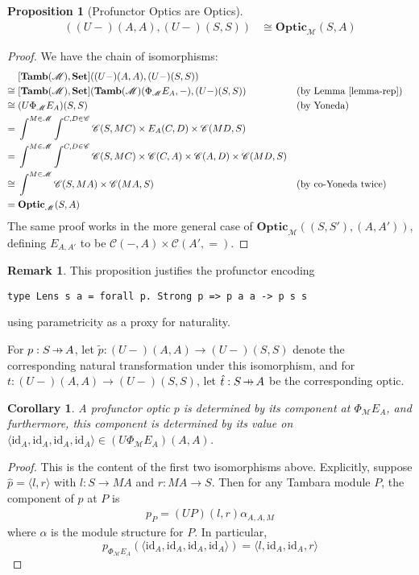 \documentclass[11pt,a4paper]{article}
\theoremstyle{plain}
\newtheorem{proposition}[theorem]{Proposition}
\newtheorem{corollary}[theorem]{Corollary}
\theoremstyle{definition}
\newtheorem{remark}[theorem]{Remark}
\newcommand{\C}{\mathscr{C}}
\newcommand{\M}{\mathscr{M}}
\newcommand{\Pastro}{\Phi}
\newcommand{\Set}{\mathbf{Set}}
\newcommand{\Optic}{\mathbf{Optic}}
\newcommand{\Tamb}{\mathbf{Tamb}}
\newcommand{\id}{\mathrm{id}}
\newcommand{\hto}{\ensuremath{\,\mathaccent\shortmid\rightarrow\,}}
\begin{document}
\begin{proposition}[Profunctor Optics are Optics]\label{prop-profunctor-optics-are-optics}
  \begin{align*}
    [\Tamb(\M), \Set]((U-)(A,A),(U-)(S,S)) &\cong \Optic_\M(S, A)
  \end{align*}
\end{proposition}
\begin{proof}
  We have the chain of isomorphisms:
  \begin{align*}
    &[\Tamb(\M), \Set]((U-)(A,A),(U-)(S,S)) \\
    \cong \;&[\Tamb(\M), \Set](\Tamb(\M)(\Pastro_\M E_A, -), (U-)(S,S))  && \text{(by Lemma \ref{lemma-rep})}\\
    \cong \;&(U\Pastro_\M E_A)(S,S)  && \text{(by Yoneda)} \\
    = \;&\int^{M \in \M} \int^{C,D \in \C} \C(S, MC) \times E_A(C,D) \times \C(MD,S) \\
    = \;&\int^{M \in \M} \int^{C,D \in \C} \C(S, MC) \times \C(C,A) \times \C(A,D) \times \C(MD,S) \\
    \cong \;&\int^{M \in \M} \C(S, MA) \times \C(MA, S)  && \text{(by co-Yoneda twice)} \\
    = \;&\Optic_\M(S, A)
  \end{align*}
  The same proof works in the more general case of $\Optic_\M((S, S'), (A,A'))$, defining $E_{A, A'}$ to be $\C(-, A) \times \C(A', {=})$.
\end{proof}

\begin{remark}
  This proposition justifies the profunctor encoding
\begin{verbatim}
type Lens s a = forall p. Strong p => p a a -> p s s
\end{verbatim}
  using parametricity as a proxy for naturality.
\end{remark}

For $p : S \hto A$, let $\tilde{p} : (U-)(A,A) \rightarrow (U-)(S,S)$ denote the corresponding natural transformation under this isomorphism, and for $t : (U-)(A,A) \rightarrow (U-)(S,S)$, let $\hat{t} : S \hto A$ be the corresponding optic.

\begin{corollary}
  A profunctor optic $p$ is determined by its component at $\Pastro_\M E_A$, and furthermore, this component is determined by its value on $\langle \id_A, \id_A, \id_A, \id_A \rangle \in (U \Pastro_\M E_A)(A, A)$.
\end{corollary}
\begin{proof}
  This is the content of the first two isomorphisms above. Explicitly, suppose $\hat{p} = \langle l, r \rangle$ with $l : S \to MA$ and $r : MA \to S$. Then for any Tambara module $P$, the component of $p$ at $P$ is
  \begin{align*}
    p_P = (UP)(l,r) \alpha_{A,A,M}
  \end{align*}
  where $\alpha$ is the module structure for $P$. In particular,
  \[
    p_{\Pastro_\M E_A}(\langle \id_A, \id_A, \id_A, \id_A \rangle) = \langle l, \id_A, \id_A, r \rangle
  \]
\end{proof}
\end{document}
